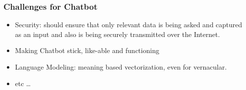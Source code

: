   





  
 

\begin{frame}[fragile]\frametitle{Challenges for Chatbot}

\begin{itemize}
\item Security:  should ensure that only relevant data is being asked and captured as an input and also is being securely transmitted over the Internet.
\item Making Chatbot stick, like-able and functioning
\item Language Modeling: meaning based vectorization, even for vernacular.
\item etc \ldots
\end{itemize}
\end{frame}




